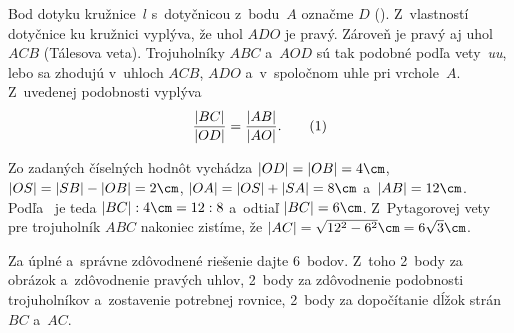 {%
Bod dotyku kružnice~$l$ s~dotyčnicou z~bodu~$A$ označme $D$
(\obr). Z~vlastností dotyčnice ku kružnici vyplýva, že uhol $ADO$ je
%
pravý. Zároveň je pravý aj uhol $ACB$ (Tálesova veta). Trojuholníky
$ABC$ a~$AOD$ sú tak podobné podľa vety~{\it uu}, lebo sa
zhodujú v~uhloch $ACB$, $ADO$ a~v~spoločnom uhle pri vrchole~$A$.
Z~uvedenej podobnosti vyplýva
$$
{|BC|\over|OD|}={|AB|\over|AO|}.    \tag1
$$

Zo zadaných číselných hodnôt vychádza $|OD|=|OB|=4\cm$,
$|OS|=|SB|-|OB|=2\cm$, $|OA|=|OS|+|SA|=8\cm$ a~$|AB|=12\cm$.
Podľa~ je teda $|BC|:4\cm = 12:8$ a~odtiaľ  $|BC|=6\cm$.
Z~Pytagorovej vety pre trojuholník $ABC$ nakoniec zistíme, že
$|AC| = \sqrt{12^2-6^2}\cm=6\sqrt 3\cm$.


\nobreak\medskip\petit\noindent
Za úplné a~správne zdôvodnené riešenie dajte 6~bodov. Z~toho
2~body za obrázok a~zdôvodnenie pravých uhlov, 2~body za zdôvodnenie
podobnosti trojuholníkov a~zostavenie potrebnej rovnice, 2~body za
dopočítanie dĺžok strán $BC$ a~$AC$.
\endpetit
\bigbreak
}

